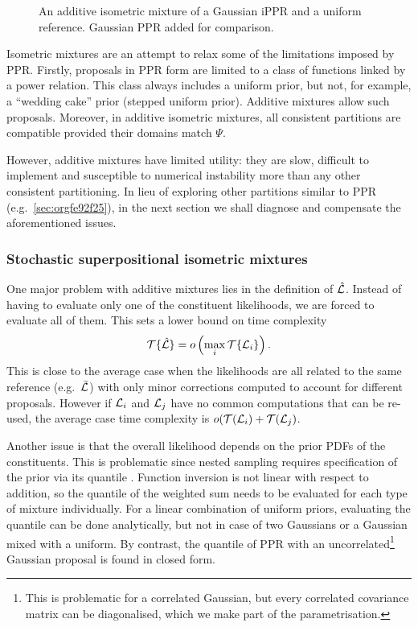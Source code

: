 \documentclass[usenatbib]{mnras}
\begin{document}
\begin{figure}
  
  \caption{\label{fig:additive} An additive isometric mixture of a
    Gaussian iPPR and a uniform reference. Gaussian PPR added for comparison.}
\end{figure}

Isometric mixtures are an attempt to relax some of the limitations
imposed by PPR. Firstly, proposals in PPR form are limited to a class
of functions linked by a power relation. This class always includes a
uniform prior, but not, for example, a ``wedding cake'' prior (stepped
uniform prior). Additive mixtures allow such proposals. Moreover, in
additive isometric mixtures, all consistent partitions are compatible
provided their domains match $\Psi$.

However, additive mixtures have limited utility: they are slow,
difficult to implement and susceptible to numerical instability more
than any other consistent partitioning. In lieu of exploring other
partitions similar to PPR (e.g.~\cref{sec:orgfe92f25}), in the next
section we shall diagnose and compensate the aforementioned issues.

\subsubsection{Stochastic superpositional isometric mixtures}

One major problem with additive mixtures lies in the definition of
$\hat{\cal L}$. Instead of having to evaluate only one of the
constituent likelihoods, we are forced to evaluate all of them. This
sets a lower bound on time complexity
\begin{equation}
  {\cal T}\{\hat{\cal L}\} = o \left(   \max_{i} {\cal T}\{ {\cal L}_{i}\} \right).\label{eq:hard-cap}
\end{equation}
This is close to the average case when the likelihoods are all related
to the same reference (e.g.~$\bar{\cal L}$) with only minor
corrections computed to account for different proposals. However if
${\cal L}_{i}$ and ${\cal L}_{j}$ have no common computations that can
be re-used, the average case time complexity is
\(o({\cal T}({\cal L}_{i})+ {\cal T}({\cal L}_{j})\).


Another issue is that the overall likelihood depends on the prior PDFs
of the constituents. This is problematic since nested sampling
requires specification of the prior via its quantile
\cite{Skilling2006,polychord,multinest}. Function inversion is not
linear with respect to addition, so the quantile of the weighted sum
needs to be evaluated for each type of mixture individually. For a
linear combination of uniform priors, evaluating the quantile can be
done analytically, but not in case of two Gaussians or a Gaussian
mixed with a uniform. By contrast, the quantile of PPR with an
uncorrelated\footnote{This is problematic for a correlated Gaussian,
  but every correlated covariance matrix can be diagonalised, which we
  make part of the parametrisation.}  Gaussian proposal is found in
closed form.
\end{document}
